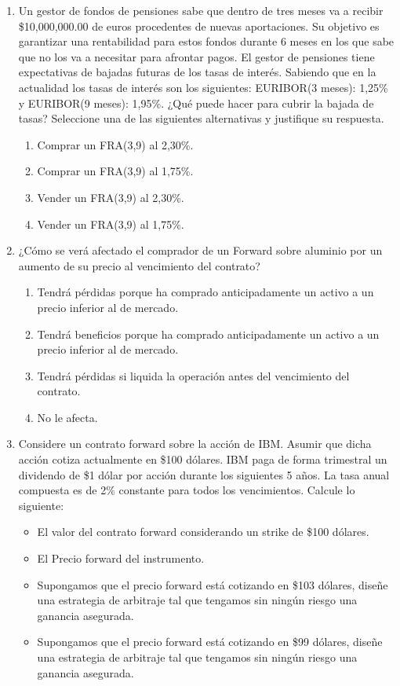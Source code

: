 \documentclass{article}
\begin{document}
\begin{enumerate}
\item Un gestor de fondos de pensiones sabe que dentro de tres meses va a
recibir \$10,000,000.00 de euros procedentes de nuevas aportaciones. Su
objetivo es garantizar una rentabilidad para estos fondos durante 6 meses
en los que sabe que no los va a necesitar para afrontar pagos. El gestor de
pensiones tiene expectativas de bajadas futuras de los tasas de interés.
Sabiendo que en la actualidad los tasas de interés son los siguientes:
EURIBOR(3 meses): 1,25\% y EURIBOR(9 meses): 1,95\%. ¿Qué puede
hacer para cubrir la bajada de tasas? Seleccione una de las siguientes
 alternativas y justifique su respuesta.

\begin{enumerate}
    \item Comprar un FRA(3,9) al 2,30\%.
    \item Comprar un FRA(3,9) al 1,75\%.
    \item Vender un FRA(3,9) al 2,30\%.
    \item Vender un FRA(3,9) al 1,75\%.
\end{enumerate}

\item ¿Cómo se verá afectado el comprador de un Forward sobre aluminio por
un aumento de su precio al vencimiento del contrato?

\begin{enumerate}
    \item Tendrá pérdidas porque ha comprado anticipadamente un activo a un
    precio inferior al de mercado.
    \item Tendrá beneficios porque ha comprado anticipadamente un activo a un
    precio inferior al de mercado.
    \item Tendrá pérdidas si liquida la operación antes del vencimiento del
    contrato.
    \item No le afecta.
\end{enumerate}

\item Considere un contrato forward sobre la acción de IBM. 
      Asumir que dicha acción cotiza actualmente en \$100 dólares.
      IBM paga de forma trimestral un dividendo de \$1 dólar por acción durante
      los siguientes 5 años. La tasa anual compuesta es de 2\% constante para
      todos los vencimientos. Calcule lo siguiente:
      \begin{itemize}
        \item El valor del contrato forward considerando un strike de \$100 dólares.
        \item El Precio forward del instrumento.
        \item Supongamos que el precio forward está cotizando en \$103 dólares, diseñe
            una estrategia de arbitraje tal que tengamos sin ningún riesgo una ganancia asegurada.
            \item Supongamos que el precio forward está cotizando en \$99 dólares, diseñe
            una estrategia de arbitraje tal que tengamos sin ningún riesgo una ganancia asegurada.
      \end{itemize}


\end{enumerate}
\end{document}
